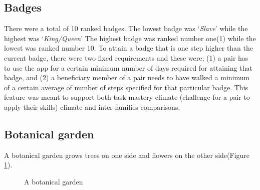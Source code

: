 \documentclass{sig-alternate}
\begin{document}
\subsection*{\textbf{Badges}}
There were a total of 10 ranked badges. The lowest badge was `\emph{Slave}' while the highest was `\emph{King/Queen}' The highest badge was ranked number one(1) while the lowest was ranked number 10. To attain a badge that is one step higher than the current badge, there were two fixed requirements and these were; (1) a pair has to use the app for a certain minimum number of days required for attaining that badge, and (2) a beneficiary member of a pair needs to have walked a minimum of a certain average of number of steps specified for that particular badge. This feature was meant to support both task-mastery climate (challenge for a pair to apply their skills) climate and inter-families comparisons.
\subsection*{\textbf{Botanical garden}}
A botanical garden grows trees on one side and flowers on the other side(Figure \ref{figure:botanical}).
\begin{figure}[H]
\centering
{}
\caption{A botanical garden}
\label{figure:botanical}
\end{figure}
\end{document}
